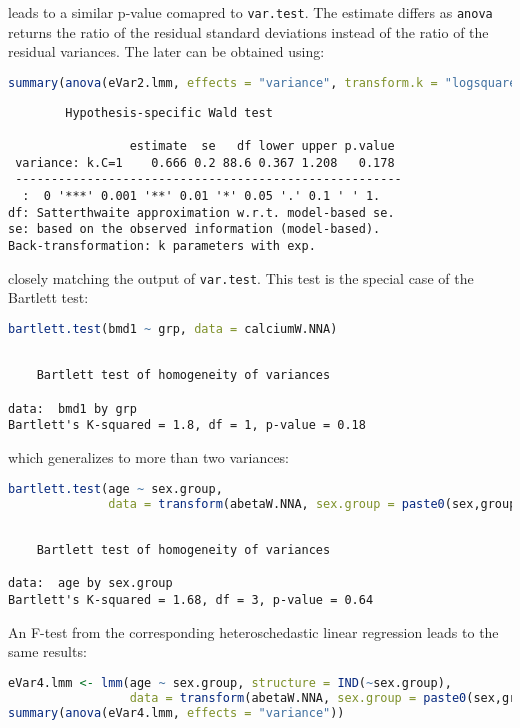 \documentclass[12pt]{article}
\begin{document}
leads to a similar p-value comapred to \texttt{var.test}. The estimate
differs as \texttt{anova} returns the ratio of the residual standard
deviations instead of the ratio of the residual variances. The later
can be obtained using:
\begin{lstlisting}[language=r,numbers=none]
summary(anova(eVar2.lmm, effects = "variance", transform.k = "logsquare"))
\end{lstlisting}

\label{}
\begin{verbatim}
		Hypothesis-specific Wald test 

                 estimate  se   df lower upper p.value  
 variance: k.C=1    0.666 0.2 88.6 0.367 1.208   0.178  
 ------------------------------------------------------ 
  :  0 '***' 0.001 '**' 0.01 '*' 0.05 '.' 0.1 ' ' 1.
df: Satterthwaite approximation w.r.t. model-based se. 
se: based on the observed information (model-based). 
Back-transformation: k parameters with exp.
\end{verbatim}


closely matching the output of \texttt{var.test}. This test is the special
case of the Bartlett test:
\begin{lstlisting}[language=r,numbers=none]
bartlett.test(bmd1 ~ grp, data = calciumW.NNA)
\end{lstlisting}

\label{}
\begin{verbatim}

	Bartlett test of homogeneity of variances

data:  bmd1 by grp
Bartlett's K-squared = 1.8, df = 1, p-value = 0.18
\end{verbatim}


which generalizes to more than two variances:
\begin{lstlisting}[language=r,numbers=none]
bartlett.test(age ~ sex.group,
              data = transform(abetaW.NNA, sex.group = paste0(sex,group)))
\end{lstlisting}

\label{}
\begin{verbatim}

	Bartlett test of homogeneity of variances

data:  age by sex.group
Bartlett's K-squared = 1.68, df = 3, p-value = 0.64
\end{verbatim}


An F-test from the corresponding heteroschedastic linear regression
leads to the same results:
\begin{lstlisting}[language=r,numbers=none]
eVar4.lmm <- lmm(age ~ sex.group, structure = IND(~sex.group),
                 data = transform(abetaW.NNA, sex.group = paste0(sex,group)))
summary(anova(eVar4.lmm, effects = "variance"))
\end{lstlisting}
\end{document}

